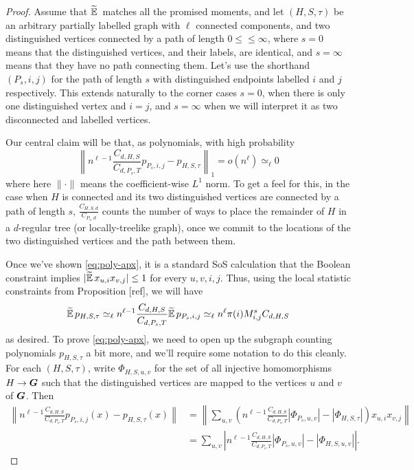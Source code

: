 \begin{proof}
    Assume that $\widetilde{\operatorname*{\mathbb{E}}}\,$ matches all the promised moments, and let $(H,S,\tau)$ be an arbitrary partially labelled graph with $\ell$ connected components, and two distinguished vertices connected by a path of length $0 \le \le \infty$, where $s = 0$ means that the distinguished vertices, and their labels, are identical, and $s = \infty$ means that they have no path connecting them. Let's use the shorthand $(P_s,i,j)$ for the path of length $s$ with distinguished endpoints labelled $i$ and $j$ respectively. This extends naturally to the corner cases $s = 0$, when there is only one distinguished vertex and $i = j$, and $s = \infty$ when we will interpret it as two disconnected and labelled vertices.

    Our central claim will be that, as polynomials, with high probability
    \begin{equation} \label{eq:poly-apx}
        \left\| n^{\ell - 1}\frac{C_{d,H,S}}{C_{d,P_s,T}}p_{P_s,i,j} - p_{H,S,\tau} \right\|_1 = o(n^\ell) \simeq_\ell 0
    \end{equation}
    where here $\|\cdot \|$ means the coefficient-wise $L^1$ norm. To get a feel for this, in the case when $H$ is connected and its two distinguished vertices are connected by a path of length $s$, $\tfrac{C_{H,S,d}}{C_{P_s,d}}$ counts the number of ways to place the remainder of $H$ in a $d$-regular tree (or locally-treelike graph), once we commit to the locations of the two distinguished vertices and the path between them. 

    Once we've shown \eqref{eq:poly-apx}, it is a standard SoS calculation that the Boolean constraint implies $|\widetilde{\operatorname*{\mathbb{E}}}\, x_{u,i}x_{v,j}| \le 1$ for every $u,v,i,j$. Thus, using the local statistic constraints from Proposition [ref], we will have
    $$
        \widetilde{\operatorname*{\mathbb{E}}}\, p_{H,S,\tau} \simeq_\ell n^{\ell - 1}\frac{C_{d,H,S}}{C_{d,P_s,T}} \widetilde{\operatorname*{\mathbb{E}}}\, p_{P_s,i,j} \simeq_\ell n^\ell \pi(i)M_{i,j}^s C_{d,H,S}
    $$
    as desired. To prove \eqref{eq:poly-apx}, we need to open up the subgraph counting polynomials $p_{H,S,\tau}$ a bit more, and we'll require some notation to do this cleanly. For each $(H,S,\tau)$, write $\Phi_{H,S,u,v}$ for the set of all injective homomorphisms $H \to \boldsymbol{G}$ such that the distinguished vertices are mapped to the vertices $u$ and $v$ of $\boldsymbol{G}$. Then
    \begin{align*}
        \left\|n^{\ell - 1}\frac{C_{d,H,S}}{C_{d,P_s,T}} p_{P_s,i,j}(x) - p_{H,S,\tau}(x)\right\|
        &= \left\|\sum_{u,v} \left(n^{\ell - 1}\frac{C_{d,H,S}}{C_{d,P_s,T}}|\Phi_{P_s,u,v}| - |\Phi_{H,S,\tau}| \right) x_{u,i}x_{v,j}\right\| \\
        &= \sum_{u,v} \left|n^{\ell - 1}\frac{C_{d,H,S}}{C_{d,P_s,T}}|\Phi_{P_s,u,v}| - |\Phi_{H,S,u,v}| \right|.
    \end{align*}


\end{proof}
